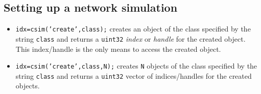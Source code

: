 %
%
%
%
%
%  
%
%
%
%


\subsection{Setting up a network simulation}


\begin{itemize}
  

\item \texttt{idx=csim('create',class);} creates an object of the class
  specified by the string \texttt{class} and returns a \texttt{uint32}
  \emph{index} or \emph{handle} for the created object. This
  index/handle is the only means to access the created object.
  
\item \texttt{idx=csim('create',class,N);} creates \texttt{N} objects
  of the class specified by the string \texttt{class} and returns a
  \texttt{uint32} vector of indices/handles for the created objects.

\end{itemize}

